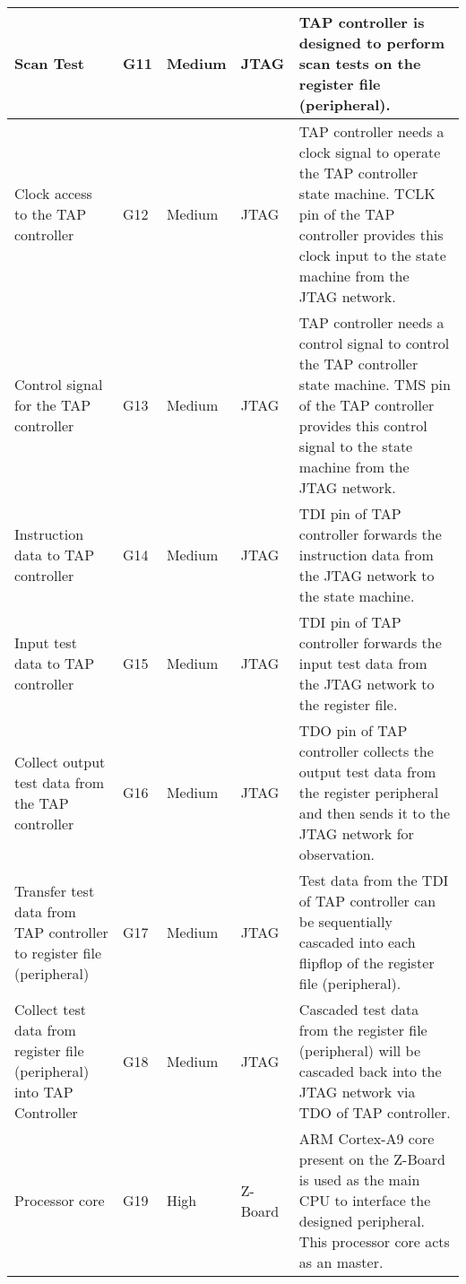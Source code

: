 \begin{longtable}{|p{3.5cm}|p{1cm}|p{2cm}|p{2cm}|p{6.5cm}|}
  \hline
 Scan Test & G11 & Medium & JTAG & TAP controller is designed to perform scan tests on the register file (peripheral).
\\
 \hline
 Clock access to the TAP controller & G12 & Medium & JTAG & TAP controller needs a clock signal to operate the TAP controller state machine. TCLK pin of the TAP controller provides this clock input to the state machine from the JTAG network.
  \\

 \hline
 Control signal for the TAP controller & G13 & Medium & JTAG & TAP controller needs a control signal to control the TAP controller state machine. TMS pin of the TAP controller provides this control signal to the state machine from the JTAG network.
  \\
 \hline
 Instruction data to TAP controller & G14 & Medium & JTAG & TDI pin of TAP controller forwards the instruction data from the JTAG network to the state machine.
  \\
 \hline
 Input test data to TAP controller & G15 & Medium & JTAG & TDI pin of TAP controller forwards the input test data from the JTAG network to the register file.
  \\
 \hline
 Collect output test data from the TAP controller & G16 & Medium & JTAG & TDO pin of TAP controller collects the output test data from the register peripheral and then sends it to the JTAG network for observation.
  \\
 \hline
 Transfer test data from TAP controller to register file (peripheral) & G17 & Medium & JTAG & Test data from the TDI of TAP controller can be sequentially cascaded into each flipflop of the register file (peripheral).
\\
 
 \hline
Collect test data from register file (peripheral) into TAP Controller & G18 & Medium & JTAG & Cascaded test data from the register file (peripheral) will be cascaded back into the JTAG network via TDO of TAP controller.
  \\
  \hline
  
  Processor core & G19 & High & Z-Board & ARM Cortex-A9 core present on the Z-Board is used as the main CPU to interface the designed peripheral. This processor core acts as an master. \\
 \hline
\end{longtable}
